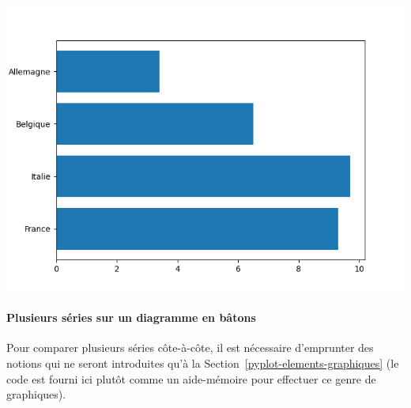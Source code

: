 \documentclass[
  12pt,
]{book}
\numberwithin{equation}{section}
\numberwithin{countremarque}{section}
\begin{document}
\begin{center}\includegraphics[width=9.03in]{figs/pyplot/barplot_h} \end{center}

\paragraph{Plusieurs séries sur un diagramme en bâtons}\label{plusieurs-suxe9ries-sur-un-diagramme-en-buxe2tons}

Pour comparer plusieurs séries côte-à-côte, il est nécessaire d'emprunter des notions qui ne seront introduites qu'à la Section~\ref{pyplot-elements-graphiques} (le code est fourni ici plutôt comme un aide-mémoire pour effectuer ce genre de graphiques).
\end{document}

